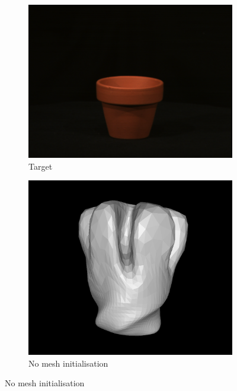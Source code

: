 \documentclass{article}
\begin{document}
\begin{figure}[h!]
  \centering
  \begin{subfigure}{.2\textwidth}
    \centering
    \includegraphics[width=\textwidth]{images/potpng.png}
    \caption{Target}
    \label{results-pot-mesh1}
  \end{subfigure}
  \hfill
  \begin{subfigure}{.2\textwidth}
    \centering
    \includegraphics[width=\textwidth]{images/potmesh_a.png}
    \caption{No mesh initialisation}
    \label{results-pot-mesh2}
  \end{subfigure}
  \hfill

\end{figure}
\end{document}
